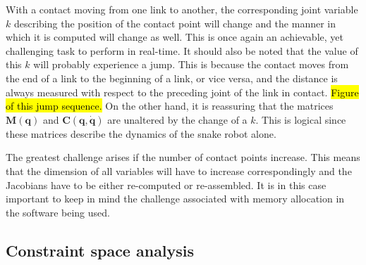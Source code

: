 With a contact moving from one link to another, the corresponding joint variable $k$ describing the position of the contact point will change and the manner in which it is computed will change as well. This is once again an achievable, yet challenging task to perform in real-time. It should also be noted that the value of this $k$ will probably experience a jump. This is because the contact moves from the end of a link to the beginning of a link, or vice versa, and the distance is always measured with respect to the preceding joint of the link in contact. \hl{Figure of this jump sequence.} On the other hand, it is reassuring that the matrices $\mathbf{M(q)}$ and $\mathbf{C(q,\dot{q})}$ are unaltered by the change of a $k$. This is logical since these matrices describe the dynamics of the snake robot alone.

The greatest challenge arises if the number of contact points increase. This means that the dimension of all variables will have to increase correspondingly and the Jacobians have to be either re-computed or re-assembled. It is in this case important to keep in mind the challenge associated with memory allocation in the software being used.






\subsection{Constraint space analysis}
